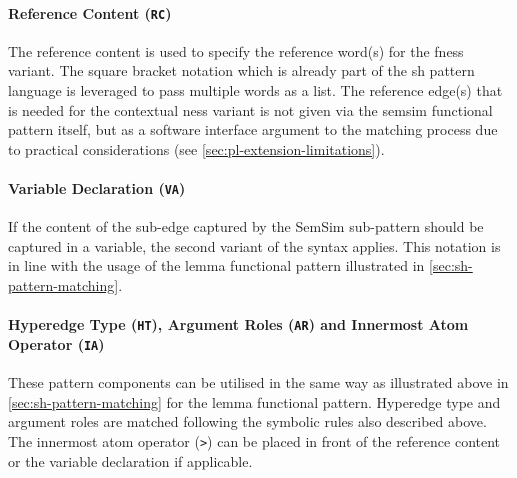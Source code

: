 \documentclass[11pt, numbers=noenddot]{scrreprt}
\begin{document}
\paragraph{Reference Content (\texttt{RC})} 
The reference content is used to specify the reference word(s) for the \gls{fness} variant. The square bracket notation which is already part of the \gls{sh} pattern language is leveraged to pass multiple words as a list. The reference edge(s) that is needed for the contextual \gls{ness} variant is not given via the semsim functional pattern itself, but as a software interface argument to the matching process due to practical considerations (see \cref{sec:pl-extension-limitations}).


\paragraph{Variable Declaration (\texttt{VA})} 
If the content of the sub-edge captured by the SemSim sub-pattern should be captured in a variable, the second variant of the syntax applies. This notation is in line with the usage of the lemma functional pattern illustrated in \cref{sec:sh-pattern-matching}.


\paragraph{Hyperedge Type (\texttt{HT}),  Argument Roles (\texttt{AR}) and Innermost Atom Operator (\texttt{IA})} These pattern components can be utilised in the same way as illustrated above in \cref{sec:sh-pattern-matching} for the lemma functional pattern.
Hyperedge type and argument roles are matched following the symbolic rules also described above. The innermost atom operator (\texttt{>}) can be placed in front of the reference content or the variable declaration if applicable.


\end{document}
